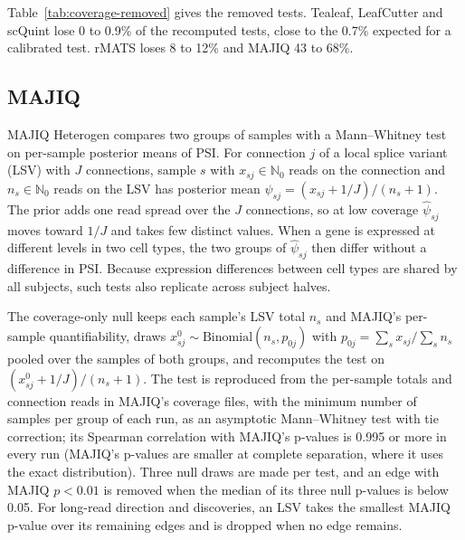 \documentclass[11pt]{article}
\begin{document}
Table~\ref{tab:coverage-removed} gives the removed tests. Tealeaf, LeafCutter and scQuint lose 0 to 0.9\% of the recomputed tests, close to the 0.7\% expected for a calibrated test. rMATS loses 8 to 12\% and MAJIQ 43 to 68\%.

\subsection{MAJIQ}
\label{sec:majiq-null}

MAJIQ Heterogen compares two groups of samples with a Mann--Whitney test on per-sample posterior means of PSI. For connection $j$ of a local splice variant (LSV) with $J$ connections, sample $s$ with $x_{sj}\in\mathbb N_0$ reads on the connection and $n_s\in\mathbb N_0$ reads on the LSV has posterior mean $\hat\psi_{sj}=(x_{sj}+1/J)/(n_s+1)$. The prior adds one read spread over the $J$ connections, so at low coverage $\hat\psi_{sj}$ moves toward $1/J$ and takes few distinct values. When a gene is expressed at different levels in two cell types, the two groups of $\hat\psi_{sj}$ then differ without a difference in PSI. Because expression differences between cell types are shared by all subjects, such tests also replicate across subject halves.

The coverage-only null keeps each sample's LSV total $n_s$ and MAJIQ's per-sample quantifiability, draws $x^0_{sj}\sim\mathrm{Binomial}(n_s,p_{0j})$ with $p_{0j}=\sum_s x_{sj}/\sum_s n_s$ pooled over the samples of both groups, and recomputes the test on $(x^0_{sj}+1/J)/(n_s+1)$. The test is reproduced from the per-sample totals and connection reads in MAJIQ's coverage files, with the minimum number of samples per group of each run, as an asymptotic Mann--Whitney test with tie correction; its Spearman correlation with MAJIQ's p-values is 0.995 or more in every run (MAJIQ's p-values are smaller at complete separation, where it uses the exact distribution). Three null draws are made per test, and an edge with MAJIQ $p<0.01$ is removed when the median of its three null p-values is below 0.05. For long-read direction and discoveries, an LSV takes the smallest MAJIQ p-value over its remaining edges and is dropped when no edge remains.
\end{document}
